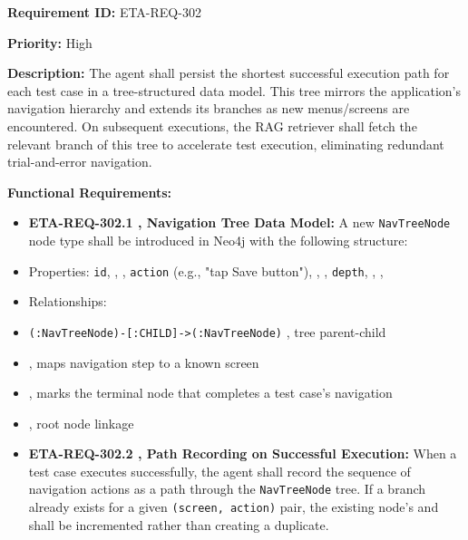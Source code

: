 \textbf{Requirement ID:} ETA-REQ-302

\textbf{Priority:} High

\textbf{Description:}
The agent shall persist the shortest successful execution path for each test case in a tree-structured data model. This tree mirrors the application's navigation hierarchy and extends its branches as new menus/screens are encountered. On subsequent executions, the RAG retriever shall fetch the relevant branch of this tree to accelerate test execution, eliminating redundant trial-and-error navigation.

\textbf{Functional Requirements:}

\begin{itemize}[leftmargin=1.4em,itemsep=1pt,topsep=3pt]
  \item \textbf{ETA-REQ-302.1 ,  Navigation Tree Data Model:} A new \texttt{NavTreeNode} node type shall be introduced in Neo4j with the following structure:
  \item Properties: \texttt{id}, , , \texttt{action} (e.g., "tap Save button"), , , \texttt{depth}, , , 
  \item Relationships:
  \item \texttt{(:NavTreeNode)-[:CHILD]->(:NavTreeNode)} ,  tree parent-child
  \item {} ,  maps navigation step to a known screen
  \item {} ,  marks the terminal node that completes a test case's navigation
  \item {} ,  root node linkage
\end{itemize}

\begin{itemize}[leftmargin=1.4em,itemsep=1pt,topsep=3pt]
  \item \textbf{ETA-REQ-302.2 ,  Path Recording on Successful Execution:} When a test case executes successfully, the agent shall record the sequence of navigation actions as a path through the \texttt{NavTreeNode} tree. If a branch already exists for a given \texttt{(screen, action)} pair, the existing node's  and  shall be incremented rather than creating a duplicate.
\end{itemize}

